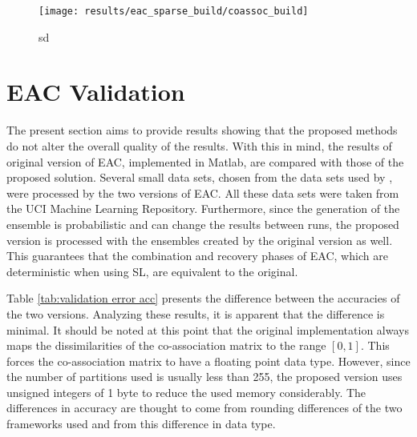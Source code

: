 \begin{figure}[hbtp]
\centering
\texttt{[image: results/eac\_sparse\_build/coassoc\_build]}
\caption{sd}
\label{fig:coassoc build sparse}
\end{figure}


%
%

\section{EAC Validation}
\label{sec:eac validation}

The present section aims to provide results showing that the proposed methods do not alter the overall quality of the results.
With this in mind, the results of original version of EAC, implemented in Matlab, are compared with those of the proposed solution.
Several small data sets, chosen from the data sets used by \citet{Lourenco2010}, were processed by the two versions of EAC.
All these data sets were taken from the UCI Machine Learning Repository. %
Furthermore, since the generation of the ensemble is probabilistic and can change the results between runs, the proposed version is processed with the ensembles created by the original version as well.
This guarantees that the combination and recovery phases of EAC, which are deterministic when using SL, are equivalent to the original.

Table \ref{tab:validation error acc} presents the difference between the accuracies of the two versions.
Analyzing these results, it is apparent that the difference is minimal.
It should be noted at this point that the original implementation always maps the dissimilarities of the co-association matrix to the range $\left [ 0 , 1 \right ]$.
This forces the co-association matrix to have a floating point data type.
However, since the number of partitions used is usually less than 255, the proposed version uses unsigned integers of 1 byte to reduce the used memory considerably.
The differences in accuracy are thought to come from rounding differences of the two frameworks used and from this difference in data type.




